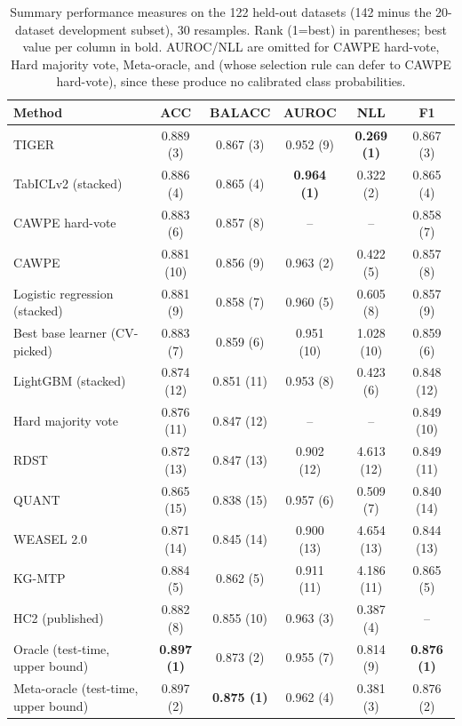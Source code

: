 \begin{table}[t]
\centering
\small
\begin{tabular}{lccccc}
\toprule
Method & ACC & BALACC & AUROC & NLL & F1 \\
\midrule
TIGER & 0.889 (3) & 0.867 (3) & 0.952 (9) & \textbf{0.269 (1)} & 0.867 (3) \\
TabICLv2 (stacked) & 0.886 (4) & 0.865 (4) & \textbf{0.964 (1)} & 0.322 (2) & 0.865 (4) \\
CAWPE hard-vote & 0.883 (6) & 0.857 (8) & -- & -- & 0.858 (7) \\
CAWPE & 0.881 (10) & 0.856 (9) & 0.963 (2) & 0.422 (5) & 0.857 (8) \\
Logistic regression (stacked) & 0.881 (9) & 0.858 (7) & 0.960 (5) & 0.605 (8) & 0.857 (9) \\
Best base learner (CV-picked) & 0.883 (7) & 0.859 (6) & 0.951 (10) & 1.028 (10) & 0.859 (6) \\
LightGBM (stacked) & 0.874 (12) & 0.851 (11) & 0.953 (8) & 0.423 (6) & 0.848 (12) \\
Hard majority vote & 0.876 (11) & 0.847 (12) & -- & -- & 0.849 (10) \\
RDST & 0.872 (13) & 0.847 (13) & 0.902 (12) & 4.613 (12) & 0.849 (11) \\
QUANT & 0.865 (15) & 0.838 (15) & 0.957 (6) & 0.509 (7) & 0.840 (14) \\
WEASEL 2.0 & 0.871 (14) & 0.845 (14) & 0.900 (13) & 4.654 (13) & 0.844 (13) \\
KG-MTP & 0.884 (5) & 0.862 (5) & 0.911 (11) & 4.186 (11) & 0.865 (5) \\
HC2 (published) & 0.882 (8) & 0.855 (10) & 0.963 (3) & 0.387 (4) & -- \\
Oracle (test-time, upper bound) & \textbf{0.897 (1)} & 0.873 (2) & 0.955 (7) & 0.814 (9) & \textbf{0.876 (1)} \\
Meta-oracle (test-time, upper bound) & 0.897 (2) & \textbf{0.875 (1)} & 0.962 (4) & 0.381 (3) & 0.876 (2) \\
\bottomrule
\end{tabular}
\caption{Summary performance measures on the 122 held-out datasets (142 minus the 20-dataset development subset), 30 resamples. Rank (1=best) in parentheses; best value per column in bold. AUROC/NLL are omitted for CAWPE hard-vote, Hard majority vote, Meta-oracle, and \algname{} (whose selection rule can defer to CAWPE hard-vote), since these produce no calibrated class probabilities.}
\label{tab:multi_metric_122_heldout}
\end{table}